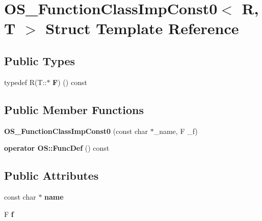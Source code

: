 \hypertarget{struct_o_s___function_class_imp_const0}{}\section{O\+S\+\_\+\+Function\+Class\+Imp\+Const0$<$ R, T $>$ Struct Template Reference}
\label{struct_o_s___function_class_imp_const0}
\subsection*{Public Types}
\begin{DoxyCompactItemize}
\item 
typedef R(T\+::$\ast$ {\bfseries F}) () const \hypertarget{struct_o_s___function_class_imp_const0_a461dcb84393b882f30b599089c188791}{}\label{struct_o_s___function_class_imp_const0_a461dcb84393b882f30b599089c188791}

\end{DoxyCompactItemize}
\subsection*{Public Member Functions}
\begin{DoxyCompactItemize}
\item 
{\bfseries O\+S\+\_\+\+Function\+Class\+Imp\+Const0} (const char $\ast$\+\_\+name, F \+\_\+f)\hypertarget{struct_o_s___function_class_imp_const0_af5fe4e8077f14cfda2eee7d43c41b87c}{}\label{struct_o_s___function_class_imp_const0_af5fe4e8077f14cfda2eee7d43c41b87c}

\item 
{\bfseries operator O\+S\+::\+Func\+Def} () const \hypertarget{struct_o_s___function_class_imp_const0_accc7ebfe25d9cdf2f64de6101e9b27a5}{}\label{struct_o_s___function_class_imp_const0_accc7ebfe25d9cdf2f64de6101e9b27a5}

\end{DoxyCompactItemize}
\subsection*{Public Attributes}
\begin{DoxyCompactItemize}
\item 
const char $\ast$ {\bfseries name}\hypertarget{struct_o_s___function_class_imp_const0_a3b5fb6a3768b6bef4a5aee0633e0eae4}{}\label{struct_o_s___function_class_imp_const0_a3b5fb6a3768b6bef4a5aee0633e0eae4}

\item 
F {\bfseries f}\hypertarget{struct_o_s___function_class_imp_const0_ab7a4735f11f4a80f8a77d3f849ddf7ea}{}\label{struct_o_s___function_class_imp_const0_ab7a4735f11f4a80f8a77d3f849ddf7ea}

\end{DoxyCompactItemize}



